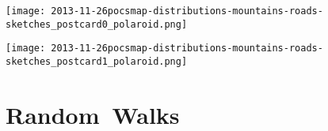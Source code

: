 





\begin{frame}
  \texttt{[image: 2013-11-26pocsmap-distributions-mountains-roads-sketches\_postcard0\_polaroid.png]}
\end{frame}

\begin{frame}
  \texttt{[image: 2013-11-26pocsmap-distributions-mountains-roads-sketches\_postcard1\_polaroid.png]}
\end{frame}

\section{Random\ Walks}

